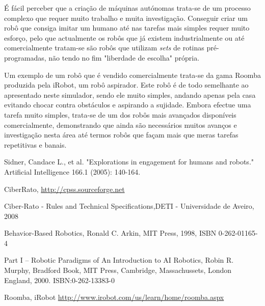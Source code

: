 \documentclass[conference]{IEEEtran}
\begin{document}
É fácil perceber que a criação de máquinas autónomas trata-se de um processo complexo que requer muito trabalho e muita investigação. Conseguir criar um robô que consiga imitar um humano até nas tarefas mais simples requer muito esforço, pelo que actualmente os robôs que já existem industrialmente ou até comercialmente tratam-se são robôs que utilizam \textit{sets} de rotinas pré-programadas, não tendo no fim "liberdade de escolha" própria.

Um exemplo de um robô que é vendido comercialmente trata-se da gama Roomba \cite{IEEEhowto:roomba} produzida pela iRobot, um robô aspirador. Este robô é de todo semelhante ao apresentado neste simulador, sendo ele muito simples, andando apenas pela casa evitando chocar contra obstáculos e aspirando a sujidade. Embora efectue uma tarefa muito simples, trata-se de um dos robôs mais avançados disponíveis comercialmente, demonstrando que ainda são necessários muitos avanços e investigação nesta área até termos robôs que façam mais que meras tarefas repetitivas e banais.









\begin{thebibliography}{1}

Sidner, Candace L., et al. "Explorations in engagement for humans and robots." Artificial Intelligence 166.1 (2005): 140-164.

CiberRato, \url{http://cpss.sourceforge.net}

Ciber-Rato - Rules and Technical Specifications,\relax DETI - Universidade de Aveiro, 2008

Behavior-Based Robotics, Ronald C. Arkin, MIT Press, 1998, ISBN 0-262-01165-4

Part I – Robotic Paradigms of An Introduction to AI Robotics, Robin R. Murphy, Bradford Book, MIT Press, Cambridge, Massachussets, London England, 2000. ISBN:0-262-13383-0

Roomba, iRobot \url{http://www.irobot.com/us/learn/home/roomba.aspx}

\end{thebibliography}




\end{document}
